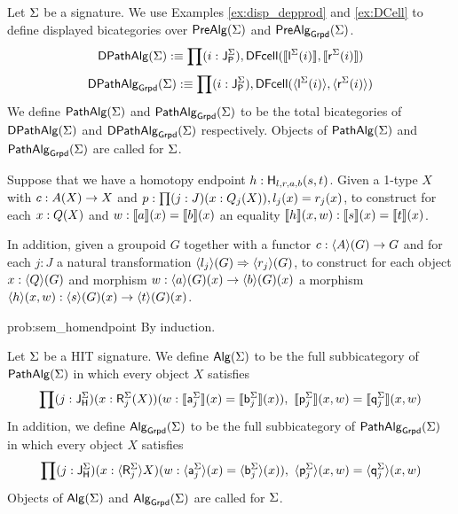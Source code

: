 \begin{definition}
\label{def:pathalg}
Let $\sign$ be a signature.
We use Examples \ref{ex:disp_depprod} and \ref{ex:DCell} to define displayed bicategories over $\prealg{\sign}$ and $\prealgG{\sign}$.
\[
\pathalgMD(\sign) \eqdef \depprod{(i : \pathlabel[\sign])}{\DCell(\semE{\pathleft[\sign](i)},\semE{\pathright[\sign](i)})}
\]
\[
\pathalgGD{\sign} \eqdef \depprod{(i : \pathlabel[\sign])}{\DCell(\semEG{\pathleft[\sign](i)},\semEG{\pathright[\sign](i)})}
\]
We define $\pathalgM(\sign)$ and $\pathalgG{\sign}$ to be the total bicategories of $\pathalgMD(\sign)$ and $\pathalgGD{\sign}$ respectively.
Objects of $\pathalgM(\sign)$ and $\pathalgG{\sign}$ are called  for $\sign$.
\end{definition}

\begin{problem}
\label{prob:sem_homendpoint}
Suppose that we have a homotopy endpoint $h : \homotendpoint{l}{r}{a}{b}{s}{t}$.
Given a 1-type $X$ with $c : \polyAct{A}{X} \rightarrow X$ and $p : \depprod{(j : J) (x : \polyAct{Q_j}{X})}{l_j(x) = r_j(x)}$,
to construct for each $x : \polyAct{Q}{X}$ and $w : \semE{a}(x) = \semE{b}(x)$
an equality $\semH{h}(x, w) : \semE{s}(x) = \semE{t}(x)$.

In addition, given a groupoid $G$ together with a functor $c : \semPG{A}{(G)} \rightarrow G$ and for each $j : J$ a natural transformation $\semEG{l_j}(G) \twocell \semEG{r_j}(G)$,
to construct for each object $x : \semPG{Q}{(G)}$ and morphism $w : \semEG{a}(G)(x) \rightarrow \semEG{b}(G)(x)$
a morphism $\semHG{h}(x, w) : \semEG{s}(G)(x) \rightarrow \semEG{t}(G)(x)$.
\end{problem}

\begin{construction}{prob:sem_homendpoint}
By induction.
\end{construction}

\begin{definition}
\label{def:bicat_grpd}
Let $\sign$ be a HIT signature.
We define $\algM(\sign)$ to be the full subbicategory of $\pathalgM(\sign)$
in which every object $X$ satisfies
\begin{equation*}
\begin{split}
\prod
(j : \homotlabel[\sign]) (x : \polyAct{\homotpointarg[\sign]_j}{X}) (w : \semE{\pathargleft[\sign]_j}(x) = \semE{\pathargright[\sign]_j}(x)),
\ \semH{\homotleft[\sign]_j}(x, w) = \semH{\homotright[\sign]_j}(x, w)
\end{split}
\end{equation*}
In addition, we define $\algG{\sign}$ to be the full subbicategory of $\pathalgG{\sign} $
in which every object $X$ satisfies
\begin{equation*}
\begin{split}
\prod
(j : \homotlabel[\sign]) (x : \semPG{\homotpointarg[\sign]_j}{X}) (w : \semEG{\pathargleft[\sign]_j}(x) = \semEG{\pathargright[\sign]_j}(x)),\
\semHG{\homotleft[\sign]_j}(x, w) = \semHG{\homotright[\sign]_j}(x, w)
\end{split}
\end{equation*}
Objects of $\algM(\sign)$ and $\algG{\sign}$ are called  for $\sign$.
\end{definition}


